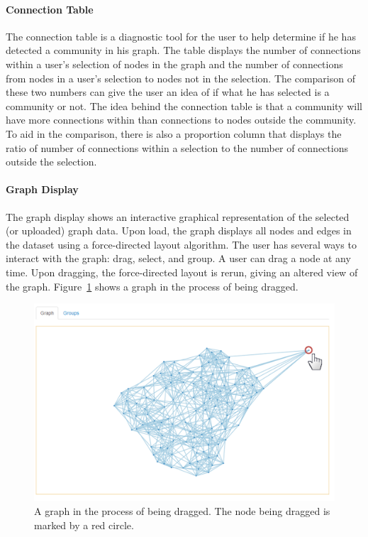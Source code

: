 \documentclass{article}\usepackage[]{graphicx}\usepackage[]{color}
\begin{document}
\paragraph{Connection Table}
The connection table is a diagnostic tool for the user to help determine if he has detected a community in his graph. The  table displays the number of connections within a user's selection of nodes in the graph and the number of connections from nodes in a user's selection to nodes not in the selection. The comparison of these two numbers can give the user an idea of if what he has selected is a community or not. The idea behind the connection table is that a community will have more connections within than connections to nodes outside the community.  To aid in the comparison, there is also a proportion column that displays the ratio of number of connections within a selection to the number of connections outside the selection. 

\paragraph{Graph Display}
The graph display shows an interactive graphical representation of  the selected (or uploaded) graph data. Upon load, the graph displays all nodes and edges in the dataset using a force-directed layout algorithm. The user has several ways to interact with the graph: drag, select, and group. A user can drag a node at any time. %
Upon dragging, the force-directed layout is  rerun, giving an altered view of the graph. Figure~\ref{fig:graphdrag} shows a graph in the process of being dragged.

\begin{figure}[H]
\centering
\includegraphics[width=\textwidth]{images/graphdrag.png}
\caption{\label{fig:graphdrag} A graph in the process of being dragged. The node being dragged is marked by a red circle.}
\end{figure}
\end{document}
